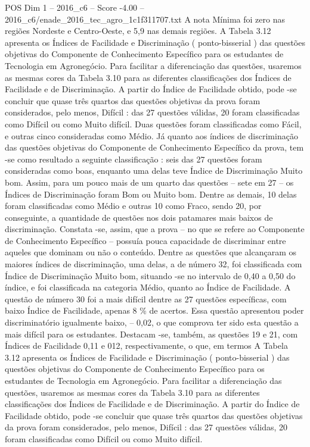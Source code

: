 \begin{textsample}{POS Dim 1 – 2016\_c6 – Score -4.00 – 2016\_c6/enade\_2016\_tec\_agro\_1c1f311707.txt}
A nota Mínima foi zero nas regiões Nordeste e Centro-Oeste, e 5,9 nas demais regiões.
A Tabela 3.12 apresenta os Índices de Facilidade e Discriminação ( ponto-bisserial ) das questões objetivas do Componente de Conhecimento Específico para os estudantes de Tecnologia em Agronegócio.
Para facilitar a diferenciação das questões, usaremos as mesmas cores da Tabela 3.10 para as diferentes classificações dos Índices de Facilidade e de Discriminação.
A partir do Índice de Facilidade obtido, pode -se concluir que quase três quartos das questões objetivas da prova foram considerados, pelo menos, Difícil : das 27 questões válidas, 20 foram classificadas como Difícil ou como Muito difícil.
Duas questões foram classificadas como Fácil, e outras cinco consideradas como Médio.
Já quanto aos índices de discriminação das questões objetivas do Componente de Conhecimento Específico da prova, tem -se como resultado a seguinte classificação : seis das 27 questões foram consideradas como boas, enquanto uma delas teve Índice de Discriminação Muito bom.
Assim, para um pouco mais de um quarto das questões – sete em 27 – os Índices de Discriminação foram Bom ou Muito bom.
Dentre as demais, 10 delas foram classificadas como Médio e outras 10 como Fraco, sendo 20, por conseguinte, a quantidade de questões nos dois patamares mais baixos de discriminação.
Constata -se, assim, que a prova – no que se refere ao Componente de Conhecimento Específico – possuía pouca capacidade de discriminar entre aqueles que dominam ou não o conteúdo.
Dentre as questões que alcançaram os maiores índices de discriminação, uma delas, a de número 32, foi classificada com Índice de Discriminação Muito bom, situando -se no intervalo de 0,40 a 0,50 do índice, e foi classificada na categoria Médio, quanto ao Índice de Facilidade.
A questão de número 30 foi a mais difícil dentre as 27 questões específicas, com baixo Índice de Facilidade, apenas 8 \% de acertos.
Essa questão apresentou poder discriminatório igualmente baixo, – 0,02, o que comprova ter sido esta questão a mais difícil para os estudantes.
Destacam -se, também, as questões 19 e 21, com Índices de Facilidade 0,11 e 012, respectivamente, o que, em termos A Tabela 3.12 apresenta os Índices de Facilidade e Discriminação ( ponto-bisserial ) das questões objetivas do Componente de Conhecimento Específico para os estudantes de Tecnologia em Agronegócio.
Para facilitar a diferenciação das questões, usaremos as mesmas cores da Tabela 3.10 para as diferentes classificações dos Índices de Facilidade e de Discriminação.
A partir do Índice de Facilidade obtido, pode -se concluir que quase três quartos das questões objetivas da prova foram considerados, pelo menos, Difícil : das 27 questões válidas, 20 foram classificadas como Difícil ou como Muito difícil.

\end{textsample}
